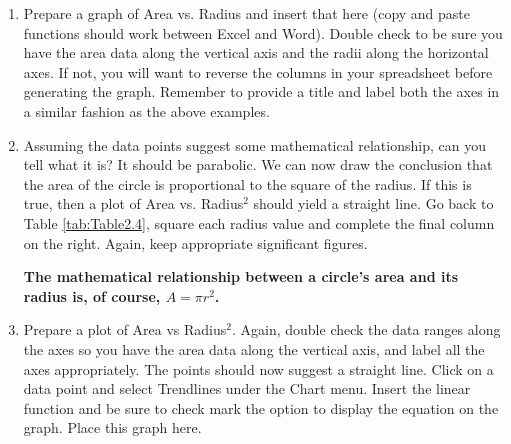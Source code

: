 \begin{enumerate}
	      \newpage

	\item Prepare a graph of Area vs. Radius and insert that here (copy and paste functions should work between Excel and Word). Double check to be sure you have the area data along the vertical axis and the radii along the horizontal axes. If not, you will want to reverse the columns in your spreadsheet before generating the graph. Remember to provide a title and label both the axes in a similar fashion as the above examples.
	\item Assuming the data points suggest some mathematical relationship, can you tell what it is? It should be parabolic. We can now draw the conclusion that the area of the circle is proportional to the square of the radius. If this is true, then a plot of Area vs. Radius$^2$ should yield a straight line. Go back to Table \ref{tab:Table2.4}, square each radius value and complete the final column on the right. Again, keep appropriate significant figures.

	      \textbf{The mathematical relationship between a circle's area and its radius is, of course, $A=\pi r^2$.}

	      \newpage

	\item Prepare a plot of Area vs Radius$^2$. Again, double check the data ranges along the axes so you have the area data along the vertical axis, and label all the axes appropriately. The points should now suggest a straight line. Click on a data point and select Trendlines under the Chart menu. Insert the linear function and be sure to check mark the option to display the equation on the graph. Place this graph here.


\end{enumerate}
